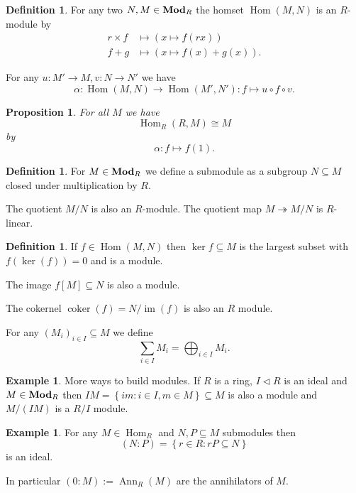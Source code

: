 \documentclass{article}
\DeclareMathOperator{\im}{im}
\DeclareMathOperator{\coker}{coker}
\DeclareMathOperator{\Hom}{Hom}
\DeclareMathOperator{\modules}{{\bf Mod}}
\newcommand{\setwith}[2]{\left\{#1:#2\right\}}
\DeclareMathOperator{\Ann}{Ann}
\newcommand{\ideal}{\triangleleft}
\newtheorem{proposition}[theorem]{Proposition}
\theoremstyle{definition}
\newtheorem{definition}[theorem]{Definition}
\newtheorem{example}[theorem]{Example}
\begin{document}
\begin{definition}
    For any two \(N,M\in\modules_{R}\) the homset \(\Hom(M,N)\) is an
    \(R\)-module by
    \begin{align*}
        r\times f & \mapsto (x\mapsto f(rx))     \\
        f+g       & \mapsto(x\mapsto f(x)+g(x)).
    \end{align*}

    For any \(u:M'\to M,v:N\to N'\) we have
    \[
        \alpha:\Hom(M,N)\to\Hom(M',N'):f\mapsto u\circ f\circ v.
    \]
\end{definition}

\begin{proposition}
    For all \(M\) we have
    \[
        \Hom_{R}(R,M)\cong M
    \]
    by
    \[
        \alpha:f\mapsto f(1).
    \]
\end{proposition}

\begin{definition}
    For \(M\in\modules_{R}\) we define a submodule as a subgroup
    \(N\subseteq M\) closed under multiplication by \(R\).

    The quotient \(M/N\) is also an \(R\)-module. The quotient map
    \(M\twoheadrightarrow M/N\) is \(R\)-linear.
\end{definition}

\begin{definition}
    If \(f\in\Hom(M,N)\) then \(\ker f\subseteq M\) is the largest subset with
    \(f(\ker(f))=0\) and is a module.

    The image \(f[M]\subseteq N\) is also a module.

    The cokernel \(\coker(f)=N/\im(f)\) is also an \(R\) module.

    For any \((M_{i})_{i\in I}\subseteq M\) we define
    \[
        \sum_{i\in I}M_{i}=\bigoplus_{i\in I}M_{i}.
    \]
\end{definition}

\begin{example}
    More ways to build modules. If \(R\) is a ring, \(I\ideal R\) is an ideal
    and \(M\in\modules_{R}\) then \(IM=\setwith{im}{i\in I,m\in M}\subseteq M\)
    is also a module and \(M/(IM)\) is a \(R/I\) module.
\end{example}

\begin{example}
    For any \(M\in\Hom_{R}\) and \(N,P\subseteq M\) submodules then
    \[
        (N:P)=\setwith{r\in R}{rP\subseteq N}
    \]
    is an ideal.

    In particular \((0:M):=\Ann_{R}(M)\) are the annihilators of \(M\).
\end{example}
\end{document}
